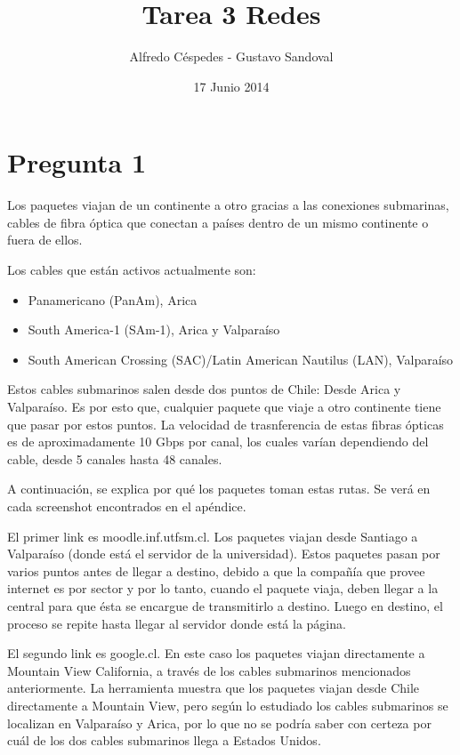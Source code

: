 \documentclass[a4paper]{article}
\title{Tarea 3 Redes}
\author{Alfredo Céspedes - Gustavo Sandoval}
\date{17 Junio 2014}
\begin{document}
\maketitle


\section{Pregunta 1}

Los paquetes viajan de un continente a otro gracias a las conexiones submarinas, cables de fibra óptica que conectan a países dentro de un mismo continente o fuera de ellos. 

Los cables que están activos actualmente son:

\begin{itemize}
\item Panamericano (PanAm), Arica
\item South America-1 (SAm-1), Arica y Valparaíso
\item South American Crossing (SAC)/Latin American Nautilus (LAN), Valparaíso
\end{itemize}

Estos cables submarinos salen desde dos puntos de Chile: Desde Arica y Valparaíso. Es por esto que, cualquier paquete que viaje a otro continente tiene que pasar por estos puntos.
La velocidad de trasnferencia de estas fibras ópticas es de aproximadamente 10 Gbps por canal, los cuales varían dependiendo del cable, desde 5 canales hasta 48 canales.

A continuación, se explica por qué los paquetes toman estas rutas. Se verá en cada screenshot encontrados en el apéndice.

El primer link es moodle.inf.utfsm.cl. Los paquetes viajan desde Santiago a Valparaíso (donde está el servidor de la universidad). Estos paquetes pasan por varios puntos antes de llegar a destino, debido a que la compañía que provee internet es por sector y por lo tanto, cuando el paquete viaja, deben llegar a la central para que ésta se encargue de transmitirlo a destino. Luego en destino, el proceso se repite hasta llegar al servidor donde está la página. 

El segundo link es google.cl. En este caso los paquetes viajan directamente a Mountain View California, a través de los cables submarinos mencionados anteriormente. La herramienta muestra que los paquetes viajan desde Chile directamente a Mountain View, pero según lo estudiado los cables submarinos se localizan en Valparaíso y Arica, por lo que no se podría saber con certeza por cuál de los dos cables submarinos llega a Estados Unidos.
\end{document}
